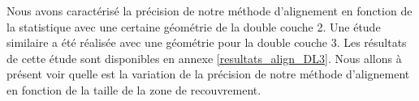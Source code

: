    \FloatBarrier

  \medskip

  Nous avons caract\'eris\'e la pr\'ecision de notre m\'ethode d'alignement en fonction de la statistique avec une certaine g\'eom\'etrie de la double couche 2. Une \'etude similaire a \'et\'e r\'ealis\'ee avec une g\'eom\'etrie pour la double couche 3. Les r\'esultats de cette \'etude sont disponibles en annexe \ref{resultats_align_DL3}.  Nous allons \`a pr\'esent voir quelle est la variation de la pr\'ecision de notre m\'ethode d'alignement en fonction de la taille de la zone de recouvrement. 
   
%   
% 
% 
%   

